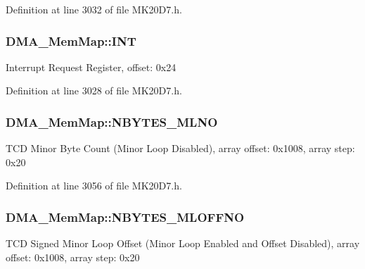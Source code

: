 Definition at line 3032 of file M\+K20\+D7.\+h.

\subsubsection[{\texorpdfstring{I\+NT}{INT}}]{ D\+M\+A\+\_\+\+Mem\+Map\+::\+I\+NT}\hypertarget{struct_d_m_a___mem_map_ab602231c6f6dc6b5a5ca439f69440251}{}\label{struct_d_m_a___mem_map_ab602231c6f6dc6b5a5ca439f69440251}
Interrupt Request Register, offset\+: 0x24 

Definition at line 3028 of file M\+K20\+D7.\+h.

\subsubsection[{\texorpdfstring{N\+B\+Y\+T\+E\+S\+\_\+\+M\+L\+NO}{NBYTES_MLNO}}]{ D\+M\+A\+\_\+\+Mem\+Map\+::\+N\+B\+Y\+T\+E\+S\+\_\+\+M\+L\+NO}\hypertarget{struct_d_m_a___mem_map_af959fbf83990ff94c7fa02b545b161c2}{}\label{struct_d_m_a___mem_map_af959fbf83990ff94c7fa02b545b161c2}
T\+CD Minor Byte Count (Minor Loop Disabled), array offset\+: 0x1008, array step\+: 0x20 

Definition at line 3056 of file M\+K20\+D7.\+h.

\subsubsection[{\texorpdfstring{N\+B\+Y\+T\+E\+S\+\_\+\+M\+L\+O\+F\+F\+NO}{NBYTES_MLOFFNO}}]{ D\+M\+A\+\_\+\+Mem\+Map\+::\+N\+B\+Y\+T\+E\+S\+\_\+\+M\+L\+O\+F\+F\+NO}\hypertarget{struct_d_m_a___mem_map_acee1602a05a1ef894cf13144755ade08}{}\label{struct_d_m_a___mem_map_acee1602a05a1ef894cf13144755ade08}
T\+CD Signed Minor Loop Offset (Minor Loop Enabled and Offset Disabled), array offset\+: 0x1008, array step\+: 0x20 

